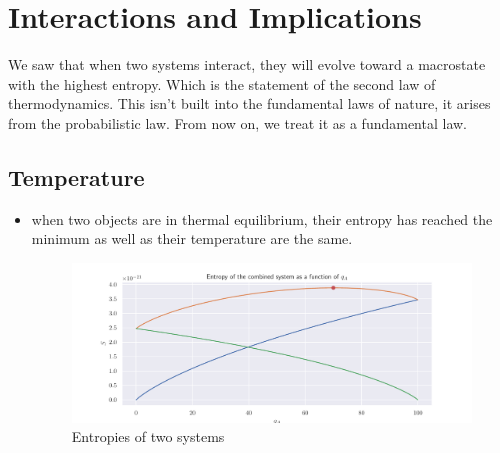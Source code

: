 \documentclass{book}
\begin{document}
\chapter{Interactions and Implications}
\label{ch:Interactions and Implications}
We saw that when two systems interact, they will evolve toward a macrostate with the highest entropy.
Which is the statement of the second law of thermodynamics. This isn't built into the fundamental laws of nature,
it arises from the probabilistic law. From now on, we treat it as a fundamental law.

\section{Temperature}%
\label{sec:temperature}

\begin{itemize}
	\item when two objects are in thermal equilibrium, their entropy has reached the minimum as well as their temperature
	      are the same.
	      \begin{figure}[ht]
		      \centering
		      \includegraphics[width=0.5\linewidth]{figures/out.pdf}
		      \caption{\label{fig:Entropies of two systems} Entropies of two systems}
	      \end{figure}


\end{itemize}
\end{document}
